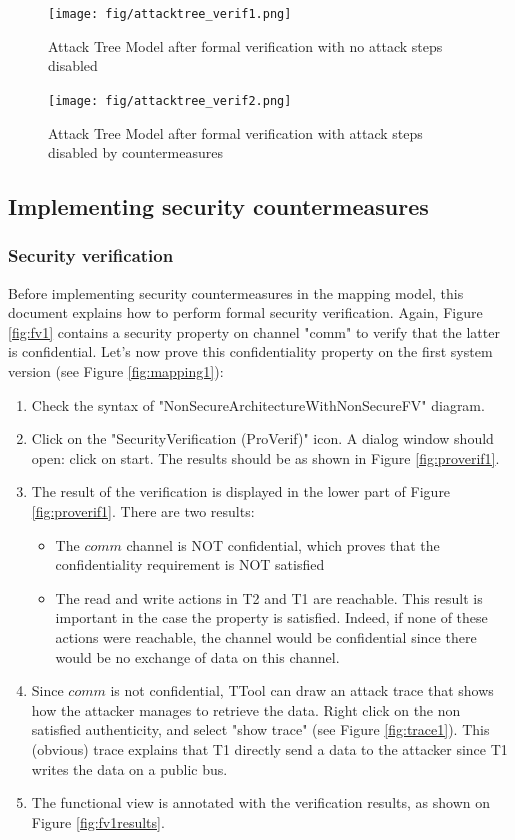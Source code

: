 \documentclass[12pt]{article}
\begin{document}
\begin{figure}[htbp]
\centering
\texttt{[image: fig/attacktree\_verif1.png]}
\caption{Attack Tree Model after formal verification with no attack steps disabled} \label{fig:attacktree_verif1}
\end{figure}

\begin{figure}[htbp]
\centering
\texttt{[image: fig/attacktree\_verif2.png]}
\caption{Attack Tree Model after formal verification with attack steps disabled by countermeasures} \label{fig:attacktree_verif2}
\end{figure}

\subsection{Implementing security countermeasures}

\subsubsection{Security verification}
Before implementing security countermeasures in the mapping model, this document explains how to perform formal security
 verification. Again, Figure \ref{fig:fv1} contains a security property on channel "comm" to verify that the latter is confidential. Let's now prove this confidentiality property on the first system version (see Figure \ref{fig:mapping1}):
\begin{enumerate}
\item Check the syntax of "NonSecureArchitectureWithNonSecureFV" diagram.
\item Click on the "SecurityVerification (ProVerif)" icon. A dialog window should open: click on start. The results should be as shown in Figure \ref{fig:proverif1}.
\item The result of the verification is displayed in the lower part of Figure \ref{fig:proverif1}. There are two results:
\begin{itemize}
\item The $comm$ channel is NOT confidential, which proves that the confidentiality requirement is NOT satisfied
\item The read and write actions in T2 and T1 are reachable. This result is important in the case the property is satisfied. Indeed, if none of these actions were reachable, the channel would be confidential since there would be no exchange of data on this channel.
\end{itemize}
\item Since $comm$ is not confidential, TTool can draw an attack trace that shows how the attacker manages to retrieve the data. Right click on the non satisfied authenticity, and select "show trace" (see Figure \ref{fig:trace1}). This (obvious) trace explains that T1 directly send a data to the attacker since T1 writes the data on a public bus.
\item The functional view is annotated with the verification results, as shown on Figure \ref{fig:fv1results}.
\end{enumerate}
\end{document}
